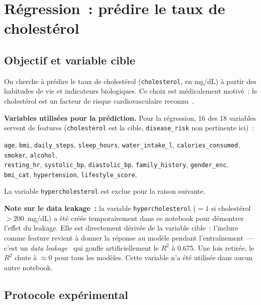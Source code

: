 
\section{Régression~: prédire le taux de cholestérol}

\subsection{Objectif et variable cible}

On cherche à prédire le taux de cholestérol (\texttt{cholesterol}, en mg/dL) à partir des habitudes de vie et indicateurs biologiques. Ce choix est médicalement motivé~: le cholestérol est un facteur de risque cardiovasculaire reconnu~\cite{ncep2002}.

\textbf{Variables utilisées pour la prédiction.} Pour la régression, 16 des 18 variables servent de features (\texttt{cholesterol} est la cible, \texttt{disease\_risk} non pertinente ici)~:
\begin{center}
\texttt{age}, \texttt{bmi}, \texttt{daily\_steps}, \texttt{sleep\_hours}, \texttt{water\_intake\_l}, \texttt{calories\_consumed}, \texttt{smoker}, \texttt{alcohol},\\
\texttt{resting\_hr}, \texttt{systolic\_bp}, \texttt{diastolic\_bp}, \texttt{family\_history}, \texttt{gender\_enc}, \texttt{bmi\_cat}, \texttt{hypertension}, \texttt{lifestyle\_score}.
\end{center}
La variable \texttt{hypercholesterol} est exclue pour la raison suivante.

\textbf{Note sur le data leakage~:} la variable \texttt{hypercholesterol} ($= 1$ si cholestérol $> 200$~mg/dL) a été créée temporairement dans ce notebook pour démontrer l'effet du leakage. Elle est directement dérivée de la variable cible~: l'inclure comme feature revient à donner la réponse au modèle pendant l'entraînement~--- c'est un \textit{data leakage}~\cite{kaufman2012} qui gonfle artificiellement le $R^2$ à 0.675. Une fois retirée, le $R^2$ chute à $\approx 0$ pour tous les modèles. Cette variable n'a été utilisée dans aucun autre notebook.

\subsection{Protocole expérimental}

